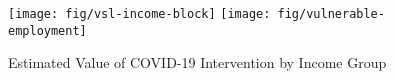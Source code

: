 \documentclass[11pt]{article}
\begin{document}
\begin{figure}[htbp!]
\centering
\label{fig:vsl-employment-income}
\caption{Estimated Value of COVID-19 Intervention by Income Group}
\texttt{[image: fig/vsl-income-block]}
\texttt{[image: fig/vulnerable-employment]}
\end{figure}






\clearpage
\begin{singlespacing}

\printbibliography

\end{singlespacing}
\end{document}
